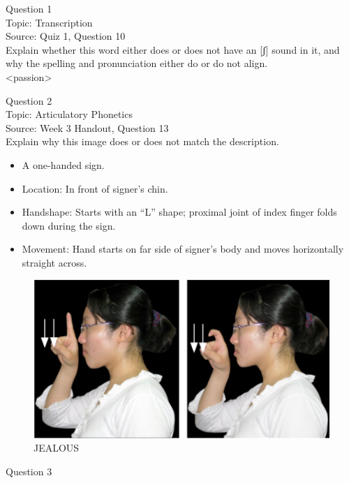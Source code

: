 \documentclass[12pt]{article}
\begin{document}
{\large Question 1}\\

Topic: Transcription\\
Source: Quiz 1, Question 10\\

Explain whether this word either does or does not have an [ʃ] sound in it, and why the spelling and pronunciation either do or do not align.\\

<passion>


\newpage

{\large Question 2}\\

Topic: Articulatory Phonetics\\
Source: Week 3 Handout, Question 13\\

Explain why this image does or does not match the description.\\

\begin{itemize} \item A one-handed sign. \item Location: In front of signer’s chin. \item Handshape: Starts with an “L” shape; proximal joint of index finger folds down during the sign. \item Movement: Hand starts on far side of signer’s body and moves horizontally straight across. \end{itemize}

\begin{figure}[H]
\includegraphics{../images/taiwansign_jealous.png}
\caption{JEALOUS}
\end{figure}

\newpage

{\large Question 3}\\
\end{document}
